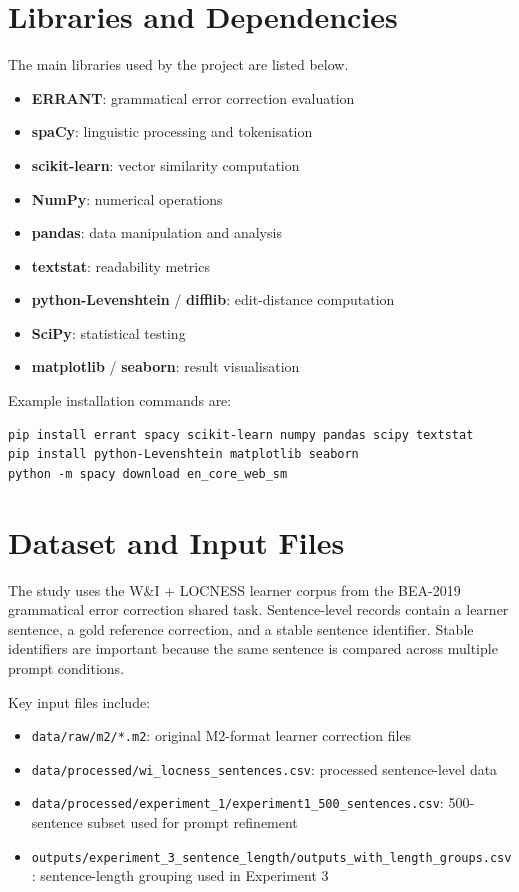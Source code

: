 \section{Libraries and Dependencies}

The main libraries used by the project are listed below.

\begin{itemize}
    \item \textbf{ERRANT}: grammatical error correction evaluation
    \item \textbf{spaCy}: linguistic processing and tokenisation
    \item \textbf{scikit-learn}: vector similarity computation
    \item \textbf{NumPy}: numerical operations
    \item \textbf{pandas}: data manipulation and analysis
    \item \textbf{textstat}: readability metrics
    \item \textbf{python-Levenshtein} / \textbf{difflib}: edit-distance computation
    \item \textbf{SciPy}: statistical testing
    \item \textbf{matplotlib} / \textbf{seaborn}: result visualisation
\end{itemize}

Example installation commands are:

\begin{verbatim}
pip install errant spacy scikit-learn numpy pandas scipy textstat
pip install python-Levenshtein matplotlib seaborn
python -m spacy download en_core_web_sm
\end{verbatim}

\section{Dataset and Input Files}

The study uses the W\&I + LOCNESS learner corpus from the BEA-2019 grammatical error correction shared task. Sentence-level records contain a learner sentence, a gold reference correction, and a stable sentence identifier. Stable identifiers are important because the same sentence is compared across multiple prompt conditions.

Key input files include:

\begin{itemize}
    \item \texttt{data/raw/m2/*.m2}: original M2-format learner correction files
    \item \texttt{data/processed/wi\_locness\_sentences.csv}: processed sentence-level data
    \item \texttt{data/processed/experiment\_1/experiment1\_500\_sentences.csv}: 500-sentence subset used for prompt refinement
    \item \texttt{outputs/experiment\_3\_sentence\_length/outputs\_with\_length\_groups.csv}: sentence-length grouping used in Experiment 3
\end{itemize}

